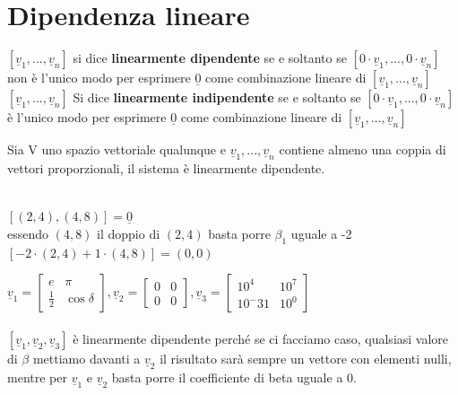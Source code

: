 \section{Dipendenza lineare}
$[\underline{v}_1,...,\underline{v}_n]$ si dice \textbf{linearmente dipendente} se e soltanto se $[0\cdot \underline{v}_1,...,0\cdot \underline{v}_n]$ non è l'unico modo per esprimere $\underline{0}$ come combinazione lineare di $[\underline{v}_1,...,\underline{v}_n]$\\
$[\underline{v}_1,...,\underline{v}_n]$ Si dice \textbf{linearmente indipendente} se e soltanto se $[0\cdot \underline{v}_1,...,0\cdot \underline{v}_n]$ è l'unico modo per esprimere $\underline{0}$ come combinazione lineare di $[\underline{v}_1,...,\underline{v}_n]$

\begin{proposizione}
	Sia V uno spazio vettoriale qualunque e $\underline{v}_1,...,\underline{v}_n$ contiene almeno una coppia di vettori proporzionali, il sistema è linearmente dipendente.
	\begin{es}
		\phantom{text}\\
		$[(2,4),(4,8)]=\underline{0}$\\
		essendo $(4,8)$ il doppio di $(2,4)$ basta porre $\beta_1$ uguale a -2\\
		$[-2\cdot(2,4)+1\cdot(4,8)]=(0,0)$
	\end{es}	
\end{proposizione}

\begin{es}
	$\underline{v}_1=\begin{bmatrix}
		e           & \pi\\
		\frac{1}{2} & \cos \delta
	\end{bmatrix}, \underline{v}_2=\begin{bmatrix}
		0 & 0\\
		0 & 0
	\end{bmatrix}, \underline{v}_3=\begin{bmatrix}
		10^4   & 10^7\\
		10^-31 & 10^0
	\end{bmatrix}$\\\\
	$[\underline{v}_1,\underline{v}_2,\underline{v}_3]$ è linearmente dipendente perché se ci facciamo caso, qualsiasi valore di $\beta$ mettiamo davanti a $\underline{v}_2$ il risultato sarà sempre un vettore con elementi nulli, mentre per $\underline{v}_1$ e $\underline{v}_2$ basta porre il coefficiente di beta uguale a 0.
\end{es}

